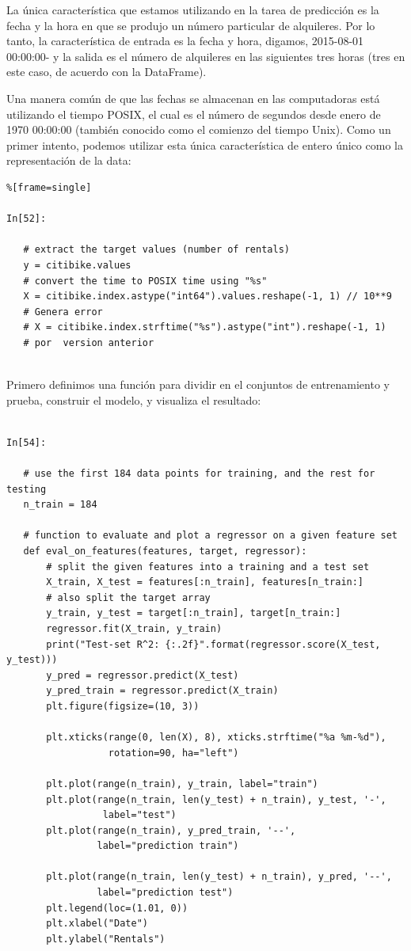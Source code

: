La única característica que estamos utilizando en la tarea de predicción es la fecha y la hora en que se produjo un número particular de alquileres. Por lo tanto, la característica  de entrada es la fecha y hora, digamos, 2015-08-01 00:00:00- y la salida es el número de alquileres en las siguientes tres horas (tres en este caso, de acuerdo con  la {\ttfamily DataFrame}).

Una  manera común de que las fechas se almacenan en las computadoras está utilizando el tiempo POSIX, el cual  es el número de segundos desde enero de 1970 00:00:00 (también conocido como el comienzo del tiempo Unix). Como un primer intento, podemos utilizar esta única característica de entero único como la representación de la data:\\

\begin{lstlisting}%[frame=single]

In[52]:

   # extract the target values (number of rentals)
   y = citibike.values
   # convert the time to POSIX time using "%s"
   X = citibike.index.astype("int64").values.reshape(-1, 1) // 10**9
   # Genera error 
   # X = citibike.index.strftime("%s").astype("int").reshape(-1, 1)
   # por  version anterior
     
\end{lstlisting}

Primero definimos una función para dividir en el conjuntos de entrenamiento y prueba, construir el modelo,
y visualiza el resultado: 

\begin{lstlisting}

In[54]:

   # use the first 184 data points for training, and the rest for testing
   n_train = 184
   
   # function to evaluate and plot a regressor on a given feature set
   def eval_on_features(features, target, regressor):
       # split the given features into a training and a test set
       X_train, X_test = features[:n_train], features[n_train:]
       # also split the target array
       y_train, y_test = target[:n_train], target[n_train:]
       regressor.fit(X_train, y_train)
       print("Test-set R^2: {:.2f}".format(regressor.score(X_test, y_test)))
       y_pred = regressor.predict(X_test)
       y_pred_train = regressor.predict(X_train)
       plt.figure(figsize=(10, 3))
       
       plt.xticks(range(0, len(X), 8), xticks.strftime("%a %m-%d"), 
                  rotation=90, ha="left")
                  
       plt.plot(range(n_train), y_train, label="train")
       plt.plot(range(n_train, len(y_test) + n_train), y_test, '-',
                 label="test")
       plt.plot(range(n_train), y_pred_train, '--', 
                label="prediction train")
       
       plt.plot(range(n_train, len(y_test) + n_train), y_pred, '--',
                label="prediction test")
       plt.legend(loc=(1.01, 0))
       plt.xlabel("Date")
       plt.ylabel("Rentals")

\end{lstlisting}

